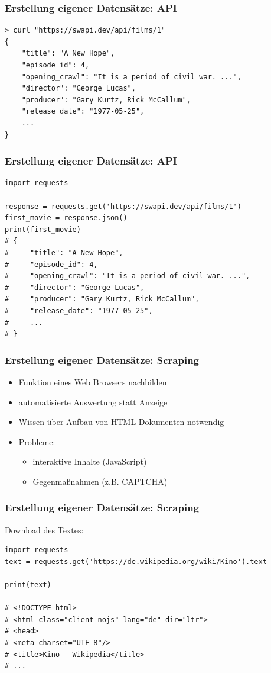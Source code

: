 \begin{frame}[fragile]
	\frametitle{Erstellung eigener Datensätze: API}
	
	\begin{verbatim}
> curl "https://swapi.dev/api/films/1"
{
    "title": "A New Hope",
    "episode_id": 4,
    "opening_crawl": "It is a period of civil war. ...",
    "director": "George Lucas",
    "producer": "Gary Kurtz, Rick McCallum",
    "release_date": "1977-05-25",
    ...
}
\end{verbatim}
\end{frame}

\begin{frame}[fragile]
	\frametitle{Erstellung eigener Datensätze: API}
	
	\begin{verbatim}
import requests

response = requests.get('https://swapi.dev/api/films/1')
first_movie = response.json()
print(first_movie)
# {
#     "title": "A New Hope",
#     "episode_id": 4,
#     "opening_crawl": "It is a period of civil war. ...",
#     "director": "George Lucas",
#     "producer": "Gary Kurtz, Rick McCallum",
#     "release_date": "1977-05-25",
#     ...
# }
\end{verbatim}
\end{frame}

\begin{frame}
	\frametitle{Erstellung eigener Datensätze: Scraping}
	
	\begin{itemize}
		\item Funktion eines Web Browsers nachbilden
		\item automatisierte Auswertung statt Anzeige
		\item Wissen über Aufbau von HTML-Dokumenten notwendig
		\item Probleme:
		\begin{itemize}
			\item interaktive Inhalte (JavaScript)
			\item Gegenmaßnahmen (z.B. CAPTCHA)
		\end{itemize}
	\end{itemize}
\end{frame}

\begin{frame}[fragile]
	\frametitle{Erstellung eigener Datensätze: Scraping}
	
	Download des Textes:

	\begin{verbatim}
import requests
text = requests.get('https://de.wikipedia.org/wiki/Kino').text

print(text)

# <!DOCTYPE html>
# <html class="client-nojs" lang="de" dir="ltr">
# <head>
# <meta charset="UTF-8"/>
# <title>Kino – Wikipedia</title>
# ...
\end{verbatim}
\end{frame}

